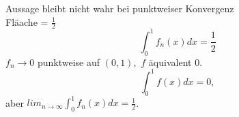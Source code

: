 \begin{subexample}
	Aussage bleibt nicht wahr bei punktweiser Konvergenz\\
	Fläache = $ \frac{ 1 }{ 2 }  $ 
	\[
		\int_{0}^{1} f_n(x) dx = \frac{ 1 }{ 2 } 
	\]
	$ f_n \to 0 $
	punktweise auf $ (0, 1), $ $ f $ äquivalent $ 0 $.
	\[
		\int_{0}^{1} f(x) dx = 0, 
	\]
	aber $ lim_{n \to \infty} \int_{0}^{1}f_n(x) dx = \frac{ 1 }{ 2 }  $.
	
\end{subexample}


